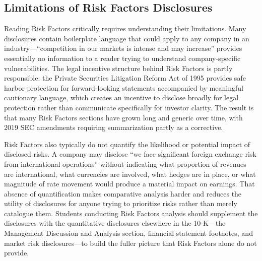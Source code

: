 \documentclass[11pt,openany]{book}
\begin{document}
\subsection{Limitations of Risk Factors Disclosures}
\label{subsec:limitations}

Reading Risk Factors critically requires understanding their limitations. Many disclosures contain boilerplate language that could apply to any company in an industry---``competition in our markets is intense and may increase'' provides essentially no information to a reader trying to understand company-specific vulnerabilities. The legal incentive structure behind Risk Factors is partly responsible: the Private Securities Litigation Reform Act of 1995 provides safe harbor protection for forward-looking statements accompanied by meaningful cautionary language, which creates an incentive to disclose broadly for legal protection rather than communicate specifically for investor clarity. The result is that many Risk Factors sections have grown long and generic over time, with 2019 SEC amendments requiring summarization partly as a corrective.

Risk Factors also typically do not quantify the likelihood or potential impact of disclosed risks. A company may disclose ``we face significant foreign exchange risk from international operations'' without indicating what proportion of revenues are international, what currencies are involved, what hedges are in place, or what magnitude of rate movement would produce a material impact on earnings. That absence of quantification makes comparative analysis harder and reduces the utility of disclosures for anyone trying to prioritize risks rather than merely catalogue them. Students conducting Risk Factors analysis should supplement the disclosures with the quantitative disclosures elsewhere in the 10-K---the Management Discussion and Analysis section, financial statement footnotes, and market risk disclosures---to build the fuller picture that Risk Factors alone do not provide.
\end{document}
